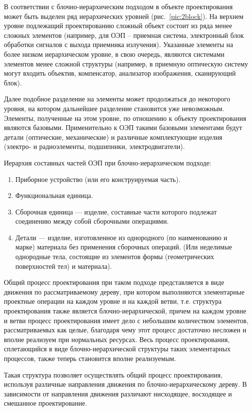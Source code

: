 В соответствии с блочно-иерархическим подходом в объекте проектирования может быть выделен ряд иерархических уровней (рис.~\ref{pic:2block}). На верхнем уровне подлежащий проектированию сложный объект состоит из ряда менее сложных элементов (например, для ОЭП -- приемная система, электронный блок обработки сигналов с выхода приемника излучения). Указанные элементы на более низком иерархическом уровне, в свою очередь, являются системами элементов менее сложной структуры (например, в приемную оптическую систему могут входить объектив, компенсатор, анализатор изображения, сканирующий блок). 

Далее подобное разделение на элементы может продолжаться до некоторого уровня, на котором дальнейшее разделение становится уже невозможным. Элементы, полученные на этом уровне, по отношению к объекту проектирования являются базовыми. Применительно к ОЭП такими базовыми элементами будут детали (оптические, механические) и различные комплектующие изделия (электро- и радиоэлементы, подшипники, электродвигатели).

Иерархия составных частей ОЭП при блочно-иерархическом подходе:
\begin{enumerate}
	\item Приборное устройство (или его конструируемая часть).
	\item Функциональная единица.
	\item Сборочная единица --- изделие, составные части которого подлежат соединению между собой сборочными операциями.
	\item Детали --- изделие, изготовленное из однородного (по наименованию и марке) материала без применения сборочных операций. (Или неделимые однородные тела, состоящие из элементов формы (геометрических поверхностей тел) и материала).
\end{enumerate}

Общий процесс проектирования при таком подходе представляется в виде движения по рассматриваемому дереву, при котором выполняются элементарные проектные операции на каждом уровне и на каждой ветви, т.е. структура проектирования также является блочно-иерархической, причем на каждом уровне и ветви процесс проектирования имеет дело с небольшим количеством элементов, рассматриваемых как целые, благодаря чему этот процесс достаточно несложен и вполне реализуем при нормальных ресурсах. Весь процесс проектирования, сплетающийся в виде блочно-иерархической структуры таких элементарных процессов, также теперь становится вполне реализуемым.

Такая структура позволяет осуществлять общий процесс проектирования, используя различные направления движения по блочно-иерархическому дереву. В зависимости от направления движения различают нисходящее, восходящее и смешанное проектирование.

